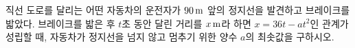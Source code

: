 직선 도로를 달리는 어떤 자동차의 운전자가 $90\mkern3mu \mathrm{m}$ 앞의 정지선을 발견하고 브레이크를 밟았다. 브레이크를 밟은 후 $t$초 동안 달린 거리를 $x\mkern3mu \mathrm{m}$라 하면 $x=36t-at^2$인 관계가 성립할 때, 자동차가 정지선을 넘지 않고 멈추기 위한 양수 $a$의 최솟값을 구하시오.
